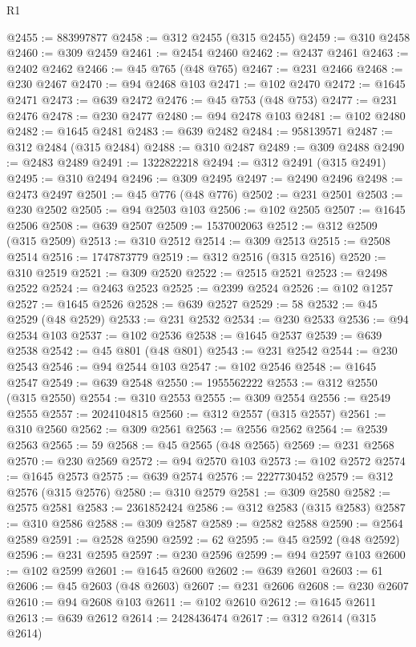 \begin{lexlean}{R1}
\begin{coremodule}
@2455 := 883997877
@2458 := @312 @2455 (@315 @2455)
@2459 := @310 @2458
@2460 := @309 @2459
@2461 := @2454 @2460
@2462 := @2437 @2461
@2463 := @2402 @2462
@2466 := @45 @765 (@48 @765)
@2467 := @231 @2466
@2468 := @230 @2467
@2470 := @94 @2468 @103
@2471 := @102 @2470
@2472 := @1645 @2471
@2473 := @639 @2472
@2476 := @45 @753 (@48 @753)
@2477 := @231 @2476
@2478 := @230 @2477
@2480 := @94 @2478 @103
@2481 := @102 @2480
@2482 := @1645 @2481
@2483 := @639 @2482
@2484 := 958139571
@2487 := @312 @2484 (@315 @2484)
@2488 := @310 @2487
@2489 := @309 @2488
@2490 := @2483 @2489
@2491 := 1322822218
@2494 := @312 @2491 (@315 @2491)
@2495 := @310 @2494
@2496 := @309 @2495
@2497 := @2490 @2496
@2498 := @2473 @2497
@2501 := @45 @776 (@48 @776)
@2502 := @231 @2501
@2503 := @230 @2502
@2505 := @94 @2503 @103
@2506 := @102 @2505
@2507 := @1645 @2506
@2508 := @639 @2507
@2509 := 1537002063
@2512 := @312 @2509 (@315 @2509)
@2513 := @310 @2512
@2514 := @309 @2513
@2515 := @2508 @2514
@2516 := 1747873779
@2519 := @312 @2516 (@315 @2516)
@2520 := @310 @2519
@2521 := @309 @2520
@2522 := @2515 @2521
@2523 := @2498 @2522
@2524 := @2463 @2523
@2525 := @2399 @2524
@2526 := @102 @1257
@2527 := @1645 @2526
@2528 := @639 @2527
@2529 := 58
@2532 := @45 @2529 (@48 @2529)
@2533 := @231 @2532
@2534 := @230 @2533
@2536 := @94 @2534 @103
@2537 := @102 @2536
@2538 := @1645 @2537
@2539 := @639 @2538
@2542 := @45 @801 (@48 @801)
@2543 := @231 @2542
@2544 := @230 @2543
@2546 := @94 @2544 @103
@2547 := @102 @2546
@2548 := @1645 @2547
@2549 := @639 @2548
@2550 := 1955562222
@2553 := @312 @2550 (@315 @2550)
@2554 := @310 @2553
@2555 := @309 @2554
@2556 := @2549 @2555
@2557 := 2024104815
@2560 := @312 @2557 (@315 @2557)
@2561 := @310 @2560
@2562 := @309 @2561
@2563 := @2556 @2562
@2564 := @2539 @2563
@2565 := 59
@2568 := @45 @2565 (@48 @2565)
@2569 := @231 @2568
@2570 := @230 @2569
@2572 := @94 @2570 @103
@2573 := @102 @2572
@2574 := @1645 @2573
@2575 := @639 @2574
@2576 := 2227730452
@2579 := @312 @2576 (@315 @2576)
@2580 := @310 @2579
@2581 := @309 @2580
@2582 := @2575 @2581
@2583 := 2361852424
@2586 := @312 @2583 (@315 @2583)
@2587 := @310 @2586
@2588 := @309 @2587
@2589 := @2582 @2588
@2590 := @2564 @2589
@2591 := @2528 @2590
@2592 := 62
@2595 := @45 @2592 (@48 @2592)
@2596 := @231 @2595
@2597 := @230 @2596
@2599 := @94 @2597 @103
@2600 := @102 @2599
@2601 := @1645 @2600
@2602 := @639 @2601
@2603 := 61
@2606 := @45 @2603 (@48 @2603)
@2607 := @231 @2606
@2608 := @230 @2607
@2610 := @94 @2608 @103
@2611 := @102 @2610
@2612 := @1645 @2611
@2613 := @639 @2612
@2614 := 2428436474
@2617 := @312 @2614 (@315 @2614)

\end{coremodule}
\end{lexlean}
